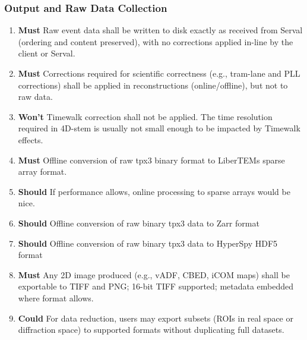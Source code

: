 \documentclass[10pt]{article}
\newcommand{\PriorityTag}[2]{%
    \colorbox{#2!25}{\footnotesize\textsf{\textbf{#1}}}\hspace{0.6em}}
\newcommand{\must}{\leavevmode\PriorityTag{Must}{green}}
\newcommand{\should}{\leavevmode\PriorityTag{Should}{yellow}}
\newcommand{\could}{\leavevmode\PriorityTag{Could}{cyan}}
\newcommand{\wont}{\leavevmode\PriorityTag{Won't}{red}}
\newcounter{reqgrp}[section] %
\newcounter{reqno}
\newcommand{\reqprefix}{GEN}
\newenvironment{requirements}[1]{%
    \renewcommand{\reqprefix}{#1}%
    \refstepcounter{reqgrp}%
    \setcounter{reqno}{0}%
    \begin{enumerate}[leftmargin=*]
    }{\end{enumerate}}
\begin{document}
    \subsubsection{Output and Raw Data Collection}
    \begin{requirements}{OUT}

        \item \must {}
        {Raw event data shall be written to disk exactly as received from Serval (ordering and content preserved), with no corrections applied in-line by the client or Serval.}

        \item \must {}
        {Corrections required for scientific correctness (e.g., tram-lane and PLL corrections) shall be applied in reconstructions (online/offline), but not to raw data.}

        \item \wont {}
        {Timewalk correction shall not be applied. The time resolution required in 4D-stem is usually not small enough to be impacted by Timewalk effects.}

        \item \must {}
        {Offline conversion of raw tpx3 binary format to LiberTEMs sparse array format.}

        \item \should {}
        {If performance allows, online processing to sparse arrays would be nice.}

        \item \should {}
        {Offline conversion of raw binary tpx3 data to Zarr format}

        \item \should {}
        {Offline conversion of raw binary tpx3 data to HyperSpy HDF5 format}

        \item \must {}
        {Any 2D image produced (e.g., vADF, CBED, iCOM maps) shall be exportable to TIFF and PNG; 16-bit TIFF supported; metadata embedded where format allows.}

        \item \could {}
        {For data reduction, users may export subsets (ROIs in real space or diffraction space) to supported formats without duplicating full datasets.}


\end{requirements}
\end{document}
